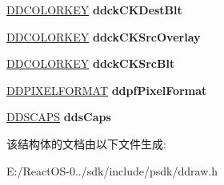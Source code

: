 \begin{DoxyCompactItemize}
\item 
\mbox{\label{struct___d_d_s_u_r_f_a_c_e_d_e_s_c_a587b63edc5947fdb7ad56e6ba5708f9b}} 
\hyperlink{struct_d_d_c_o_l_o_r_k_e_y}{D\+D\+C\+O\+L\+O\+R\+K\+EY} {\bfseries ddck\+C\+K\+Dest\+Blt}
\item 
\mbox{\label{struct___d_d_s_u_r_f_a_c_e_d_e_s_c_ac85a0ed652dcf068aacabbf0eb5b2639}} 
\hyperlink{struct_d_d_c_o_l_o_r_k_e_y}{D\+D\+C\+O\+L\+O\+R\+K\+EY} {\bfseries ddck\+C\+K\+Src\+Overlay}
\item 
\mbox{\label{struct___d_d_s_u_r_f_a_c_e_d_e_s_c_a01b06876c4e687067bc355eb6d49a1a5}} 
\hyperlink{struct_d_d_c_o_l_o_r_k_e_y}{D\+D\+C\+O\+L\+O\+R\+K\+EY} {\bfseries ddck\+C\+K\+Src\+Blt}
\item 
\mbox{\label{struct___d_d_s_u_r_f_a_c_e_d_e_s_c_a41f0271c55b3c11ec49ee792a7d406f5}} 
\hyperlink{struct___d_d_p_i_x_e_l_f_o_r_m_a_t}{D\+D\+P\+I\+X\+E\+L\+F\+O\+R\+M\+AT} {\bfseries ddpf\+Pixel\+Format}
\item 
\mbox{\label{struct___d_d_s_u_r_f_a_c_e_d_e_s_c_a0f14e275477a807a831553ad585b325c}} 
\hyperlink{struct___d_d_s_c_a_p_s}{D\+D\+S\+C\+A\+PS} {\bfseries dds\+Caps}
\end{DoxyCompactItemize}


该结构体的文档由以下文件生成\+:\begin{DoxyCompactItemize}
\item 
E\+:/\+React\+O\+S-\/0../sdk/include/psdk/ddraw.\+h\end{DoxyCompactItemize}
